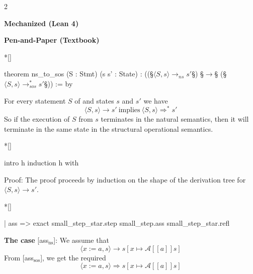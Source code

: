 \vspace{1em}
\begin{paracol}{2}
\begin{leftcolumn}
\centering \textbf{Mechanized (Lean 4)}
\end{leftcolumn}
\begin{rightcolumn}
\centering \textbf{Pen-and-Paper (Textbook)}
\end{rightcolumn}

\switchcolumn[1]*[]
\begin{leftcolumn}
    \begin{Lean_Code}
theorem ns_to_sos
  (S : Stmt)
  (s s' : State) :
  ((§\(\langle S, s\rangle \to_{ns} s'\)§) §\(\to\)§
   (§\(\langle S, s \rangle \to_{sos}^{*} s'\)§))
  := by
    \end{Lean_Code}
\end{leftcolumn}
\begin{rightcolumn} \noindent
For every statement \(S\) of \While and states \(s\) and \(s'\) we have
\[
\langle S, s \rangle \to s'\ \mbox{implies}\ \langle S, s \rangle \Rightarrow^{*} s'
\]
So if the execution of \(S\) from \(s\) terminates in the natural semantics, then it will terminate
in the same state in the structural operational semantics.

\end{rightcolumn}
\vspace{2em}

\switchcolumn[1]*[]
\begin{leftcolumn}
    \begin{Lean_Code}
  intro h
  induction h with
    \end{Lean_Code}
\end{leftcolumn}
\begin{rightcolumn} \noindent
Proof: The proof proceeds by induction on the shape of the derivation tree for\\
\(\langle S, s \rangle \to s'\).

\end{rightcolumn}
\vspace{2em}

\switchcolumn[1]*[]
\begin{leftcolumn}
    \begin{Lean_Code}
  | ass =>
    exact small_step_star.step
      small_step.ass
      small_step_star.refl
    \end{Lean_Code}
\end{leftcolumn}
\begin{rightcolumn}
\textbf{The case} [ass$_{\text{ns}}$]: We assume that
\[
\langle x:=a, s \rangle \to s[x \mapsto \mathcal{A}[\![a]\!] s]
\]
From [ass$_{\text{sos}}$], we get the required
\[
\langle x:=a, s \rangle \Rightarrow s[x \mapsto \mathcal{A}[\![a]\!] s]
\]
\end{rightcolumn}
\vspace{2em}



\end{paracol}
